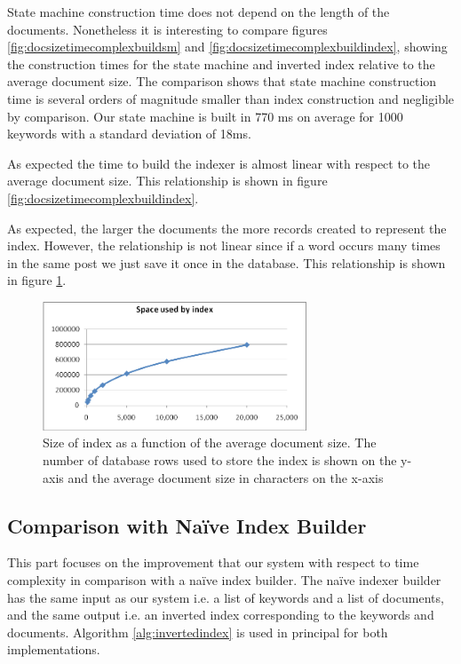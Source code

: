 \documentclass[10pt]{article}
\begin{document}
State machine construction time does not depend on the
length of the documents. Nonetheless it is interesting to compare
figures \ref{fig:docsizetimecomplexbuildsm} and
\ref{fig:docsizetimecomplexbuildindex}, showing the construction times
for the state machine and inverted index relative to the average
document size. The comparison shows that state machine construction
time is several orders of magnitude smaller than index construction
and negligible by comparison. Our state machine is built in 770 ms on
average for 1000 keywords with a standard deviation of 18ms.

As expected the time to build the indexer is almost linear with
respect to the average document size. This relationship is shown in
figure \ref{fig:docsizetimecomplexbuildindex}.

As expected, the larger the documents the more records created to
represent the index. However, the relationship is not linear since if
a word occurs many times in the same post we just save it once in the
database. This relationship is shown in figure
\ref{fig:docsizespacecomplexbuildindex}.


\begin{figure}
  \begin{center}
        \includegraphics[width=0.70\textwidth,height=!]{docsizespacecomplexbuildindex}
  \end{center}
  \caption{Size of index as a function of the average document
    size. The number of database rows used to store the index is
    shown on the y-axis and the average document size in characters
    on the x-axis}  
  \label{fig:docsizespacecomplexbuildindex}
\end{figure} 


\subsection{Comparison with Na\"{i}ve Index Builder}
This part focuses on the improvement that our system with respect to
time complexity in comparison with a na\"{i}ve index builder. The na\"{i}ve
indexer builder has the same input as our system i.e. a list of
keywords and a list of documents, and the same output i.e. an inverted
index corresponding to the keywords and documents. Algorithm
\ref{alg:invertedindex} is used in principal for both implementations.
\end{document}
